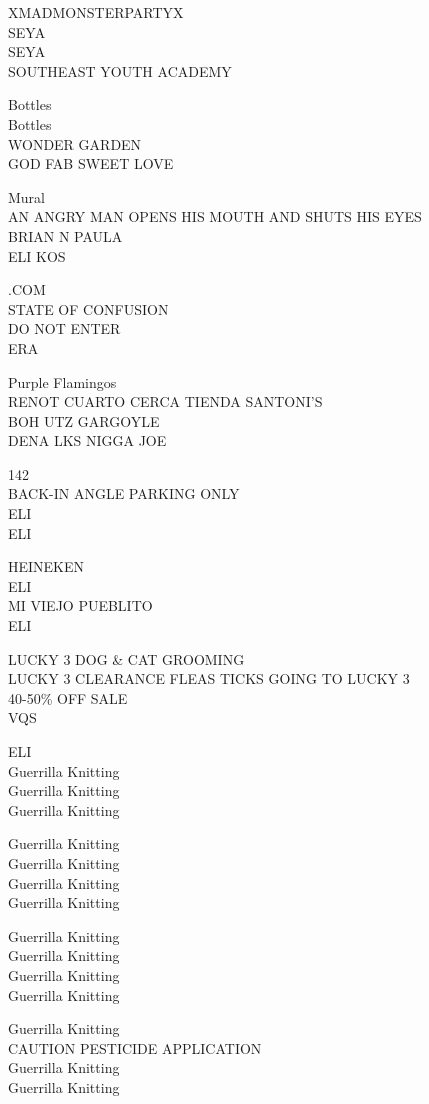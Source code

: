 \documentclass[10pt,letterpaper]{article}
\begin{document}
XMADMONSTERPARTYX\\
SEYA\\
SEYA\\
SOUTHEAST YOUTH ACADEMY

Bottles\\
Bottles\\
WONDER GARDEN\\
GOD FAB SWEET LOVE

Mural\\
AN ANGRY MAN OPENS HIS MOUTH AND SHUTS HIS EYES\\
BRIAN N PAULA\\
ELI KOS

.COM\\
STATE OF CONFUSION\\
DO NOT ENTER\\
ERA

Purple Flamingos\\
RENOT CUARTO CERCA TIENDA SANTONI'S\\
BOH UTZ GARGOYLE\\
DENA LKS NIGGA JOE

142\\
BACK{-}IN ANGLE PARKING ONLY\\
ELI\\
ELI

HEINEKEN\\
ELI\\
MI VIEJO PUEBLITO\\
ELI

LUCKY 3 DOG \& CAT GROOMING\\
LUCKY 3 CLEARANCE FLEAS TICKS GOING TO LUCKY 3\\
40{-}50\% OFF SALE\\
VQS

ELI\\
Guerrilla Knitting\\
Guerrilla Knitting\\
Guerrilla Knitting

Guerrilla Knitting\\
Guerrilla Knitting\\
Guerrilla Knitting\\
Guerrilla Knitting

Guerrilla Knitting\\
Guerrilla Knitting\\
Guerrilla Knitting\\
Guerrilla Knitting

Guerrilla Knitting\\
CAUTION PESTICIDE APPLICATION\\
Guerrilla Knitting\\
Guerrilla Knitting
\end{document}
